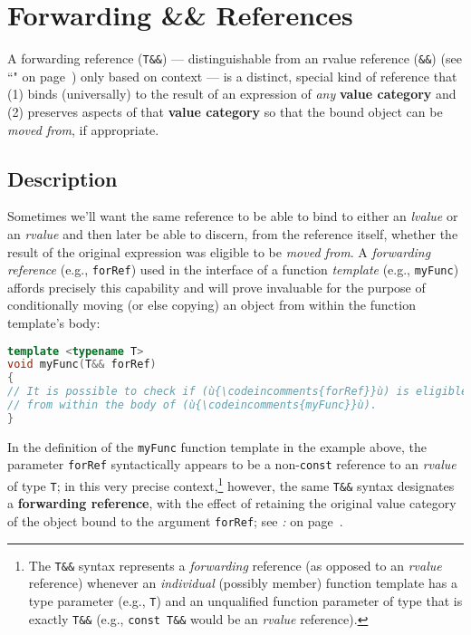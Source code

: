 \newpage
\section[Forwarding References]{Forwarding {\SecCode \&\&} References}\label{forwardingref}\label{forwarding-references}

A forwarding reference (\texttt{T\&\&}) --- distinguishable from an
rvalue reference (\texttt{\&\&}) (see ``" on page~\pageref{Rvalue-References}) only based on context
--- is a distinct, special kind of reference that (1) binds
(universally) to the result of an expression of \emph{any} \textbf{value
category} and (2) preserves aspects of that \textbf{value category} so
that the bound object can be \emph{moved from}, if appropriate.

\subsection[Description]{Description}\label{description-forwardingref}

Sometimes we'll want the same reference to be able to bind to either an
\emph{lvalue} or an \emph{rvalue} and then later be able to discern,
from the reference itself, whether the result of the original expression
was eligible to be \emph{moved from}. A \emph{forwarding reference}
(e.g., \texttt{forRef}) used in the interface of a function
\emph{template} (e.g., \texttt{myFunc}) affords precisely this
capability and will prove invaluable for the purpose of conditionally
moving (or else copying) an object from within the function template's
body:

\begin{lstlisting}[language=C++]
template <typename T>
void myFunc(T&& forRef)
{
// It is possible to check if (ù{\codeincomments{forRef}}ù) is eligible to be moved from or not
// from within the body of (ù{\codeincomments{myFunc}}ù).
}
\end{lstlisting}

\noindent In the definition of the \texttt{myFunc} function template in the example above, the
parameter \texttt{forRef} syntactically appears to be a
non-\texttt{const} reference to an \emph{rvalue} of type \texttt{T}; in
this very precise context,{\cprotect\footnote{The \texttt{T\&\&} syntax
represents a \emph{forwarding} reference (as opposed to an
\emph{rvalue} reference) whenever an \emph{individual} (possibly
member) function template has a type parameter (e.g., \texttt{T}) and
an unqualified function parameter of type that is exactly
\texttt{T\&\&} (e.g., \texttt{const}~\texttt{T\&\&} would be an
\emph{rvalue} reference).}} however, the same \texttt{T\&\&} syntax
designates a \textbf{forwarding reference}, with the effect of retaining
the original value category of the object bound to the argument
\texttt{forRef}; see \textit{: } on page~\pageref{identifying-forwarding-references}.

